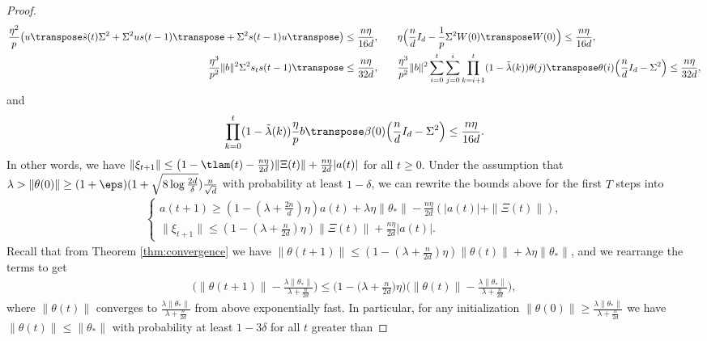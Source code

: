\begin{proof}
    \begin{align*}
        \frac{\eta^2}{p}\big(u\transpose \tilde{s}(t) \Sigma^2 + \Sigma^2 u s(t-1)\transpose + \Sigma^2 s(t-1)u\transpose\big) \leq \frac{n\eta}{16d},& \qquad \eta\Big(\frac{n}{d}I_d - \frac{1}{p}\Sigma^2 W(0)\transpose W(0)\Big) \leq \frac{n\eta}{16d}, \\
        \frac{\eta^3}{p^2}\|b\|^2 \Sigma^2 s_{t}s(t-1)\transpose \leq \frac{n\eta}{32d},& \qquad \frac{\eta^3}{p^2}\|b\|^2\sum_{i=0}^t\sum_{j=0}^i\prod_{k=i+1}^t(1-\tilde\lambda(k))\theta(j)\transpose \theta(i) \Big(\frac{n}{d}I_d-\Sigma^2\Big) \leq \frac{n\eta}{32d},
    \end{align*}
    and 
    \begin{align*}
        \prod_{k=0}^t (1-\tilde\lambda(k))\frac{\eta}{p}b\transpose\beta(0) \Big(\frac{n}{d}I_d - \Sigma^2\Big) \leq \frac{n\eta}{16d}.
    \end{align*}
    In other words, we have $\|\xi_{t+1}\| \leq \big(1-\tlam(t) - \frac{n\eta}{2d})\|\Xi(t)\| + \frac{n\eta}{2d}|a(t)|$ for all $t\geq 0$. Under the assumption that $\lambda > \|\theta(0)\|\geq (1+\eps)(1 + \sqrt{8\log\frac{2d}{\delta}}) \frac{n}{\sqrt{d}}$ with probability at least $1-\delta$, we can rewrite the bounds above for the first $T$ steps into
    \begin{align*}
        \begin{cases}
            a(t+1)\geq (1-(\lambda+\frac{2n}{d})\eta)a(t)+\lambda\eta\|\theta_*\| - \frac{n\eta}{2d} (|a(t)| + \|\Xi(t)\|), \\
            \|\xi_{t+1}\| \leq (1-(\lambda+\frac{n}{2d})\eta)\|\Xi(t)\| + \frac{n\eta}{2d} |a(t)|.
        \end{cases}
    \end{align*}
    Recall that from Theorem \ref{thm:convergence} we have $\|\theta(t+1)\| \leq (1-(\lambda + \frac{n}{2d})\eta )\|\theta(t)\| + \lambda\eta\|\theta_\ast\|$, and we rearrange the terms to get
    \begin{align*}
        \Big(\|\theta(t+1)\| - \frac{\lambda\|\theta_*\|}{\lambda + \frac{n}{2d}}\Big) \leq \Big(1-\Big(\lambda + \frac{n}{2d}\Big)\eta \Big) \Big(\|\theta(t)\|  - \frac{\lambda\|\theta_*\|}{\lambda + \frac{n}{2d}}\Big),
    \end{align*}
    where $\|\theta(t)\|$ converges to $\frac{\lambda\|\theta_*\|}{\lambda + \frac{n}{2d}}$ from above exponentially fast. 
    In particular, for any initialization $\|\theta(0)\| \geq \frac{\lambda\|\theta_*\|}{\lambda + \frac{n}{2d}}$ we have $\|\theta(t)\|\leq \|\theta_*\|$ with probability at least $1-3\delta$ for all $t$ greater than

\end{proof}

